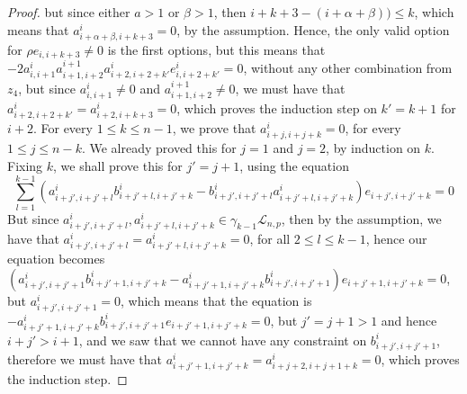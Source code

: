 \documentclass[12pt,fleqn]{article}
\begin{document}
\begin{proof}
but since either $a>1$ or $\beta>1$, then $i+k+3-(i+\alpha+\beta))\leq{k}$, which means that $a_{i+\alpha+\beta,i+k+3}^{i}=0$, by the assumption. Hence, the only valid option for ${\rho}e_{i,i+k+3}\neq{0}$ is the first options, but this means that $-2a_{i,i+1}^{i}a_{i+1,i+2}^{i+1}a_{i+2,i+2+k'}^{i}e_{i,i+2+k'}^{i}=0$, without any other combination from $z_4$, but since $a_{i,i+1}^{i}\neq{0}$ and $a_{i+1,i+2}^{i+1}\neq{0}$, we must have that $a_{i+2,i+2+k'}^{i}=a_{i+2,i+k+3}^{i}=0$, which proves the induction step on $k'=k+1$ for $i+2$.
For every $1\leq{k}\leq{n-1}$, we prove that $a_{i+j,i+j+k}^{i}=0$, for every $1\leq{j}\leq{n-k}$. We already proved this for $j=1$ and $j=2$, by induction on $k$. Fixing $k$, we shall prove this for $j'=j+1$, using the equation \[\sum_{l=1}^{k-1}(a_{i+j',i+j'+l}^{i}b_{i+j'+l,i+j'+k}^{i}-b_{i+j',i+j'+l}^{i}a_{i+j'+l,i+j'+k}^{i})e_{i+j',i+j'+k}=0\]
But since $a_{i+j',i+j'+l}^{i},a_{i+j'+l,i+j'+k}^{i}\in\gamma_{k-1}\mathcal{L}_{n,p}$, then by the assumption, we have that $a_{i+j',i+j'+l}^{i}=a_{i+j'+l,i+j'+k}^{i}=0$, for all $2\leq{l}\leq{k-1}$, hence our equation becomes $(a_{i+j',i+j'+1}^{i}b_{i+j'+1,i+j'+k}^{i}-a_{i+j'+1,i+j'+k}^{i}b_{i+j',i+j'+1}^{i})e_{i+j'+1,i+j'+k}=0$, but $a_{i+j',i+j'+1}^{i}=0$, which means that the equation is $-a_{i+j'+1,i+j'+k}^{i}b_{i+j',i+j'+1}^{i}e_{i+j'+1,i+j'+k}=0$, but $j'=j+1>1$ and hence $i+j'>i+1$, and we saw that we cannot have any constraint on $b_{i+j',i+j'+1}^{i}$, therefore we must have that $a_{i+j'+1,i+j'+k}^{i}=a_{i+j+2,i+j+1+k}^{i}=0$, which proves the induction step.
\end{proof}
\end{document}

